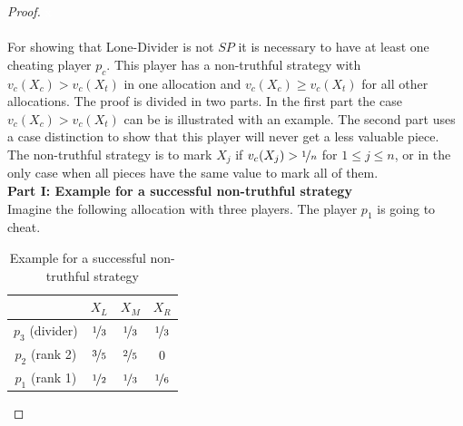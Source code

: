 \begin{proof}
\textcolor{white}{x}\\\\
For showing that Lone-Divider is not $SP$ it is necessary to have at least one cheating player $p_c$. This player has a non-truthful strategy with $v_c(X_c)>v_c(X_t)$ in one allocation and $v_c(X_c) \geq v_c(X_t)$ for all other allocations.\newpage
The proof is divided in two parts. In the first part the case $v_c(X_c)>v_c(X_t)$ can be is illustrated with an example. The second part uses a case distinction to show that this player will never get a less valuable piece.
The non-truthful strategy is to mark $X_j$ if $v_c(X_j) > \nicefrac{1}{n}$ for $1 \leq j \leq n$, or in the only case when all pieces have the same value to mark all of them.\\
\newline
\textbf{Part I: Example for a successful non-truthful strategy}\\
\newline
Imagine the following allocation with three players. The player $p_1$ is going to cheat.
		\begin{table}[htb]
		\centering
		\renewcommand{\arraystretch}{1.2}
		\begin{tabular}{c|ccc}
		& $X_L$& $X_M$& $X_R$\\
		\hline
		$p_3$ (divider)  & $\nicefrac{1}{3}$ & {$\nicefrac{1}{3}$} & $\nicefrac{1}{3}$ \\
  $p_2$ (rank 2) & {$\nicefrac{3}{5}$} & $\nicefrac{2}{5}$ & $0$\\
  $p_1$ (rank 1)& {$\nicefrac{1}{2}$} & $\nicefrac{1}{3}$ & $\nicefrac{1}{6}$
 		\end{tabular}
 		
\caption{Example for a successful non-truthful strategy}\label{Table10}
\end{table}


\end{proof}
